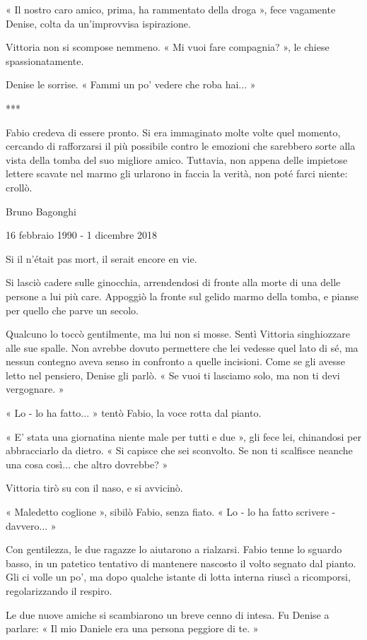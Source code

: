 « Il nostro caro amico, prima, ha rammentato della droga », fece vagamente Denise, colta da un'improvvisa ispirazione.

Vittoria non si scompose nemmeno. « Mi vuoi fare compagnia? », le chiese spassionatamente.

Denise le sorrise. « Fammi un po' vedere che roba hai... »

***

Fabio credeva di essere pronto. Si era immaginato molte volte quel momento, cercando di rafforzarsi il più possibile contro le emozioni che sarebbero sorte alla vista della tomba del suo migliore amico. Tuttavia, non appena delle impietose lettere scavate nel marmo gli urlarono in faccia la verità, non poté farci niente: crollò.

Bruno Bagonghi

16 febbraio 1990 - 1 dicembre 2018

Si il n'était pas mort, il serait encore en vie.

Si lasciò cadere sulle ginocchia, arrendendosi di fronte alla morte di una delle persone a lui più care. Appoggiò la fronte sul gelido marmo della tomba, e pianse per quello che parve un secolo.

Qualcuno lo toccò gentilmente, ma lui non si mosse. Sentì Vittoria singhiozzare alle sue spalle. Non avrebbe dovuto permettere che lei vedesse quel lato di sé, ma nessun contegno aveva senso in confronto a quelle incisioni. Come se gli avesse letto nel pensiero, Denise gli parlò. « Se vuoi ti lasciamo solo, ma non ti devi vergognare. »

« Lo - lo ha fatto... » tentò Fabio, la voce rotta dal pianto.

« E' stata una giornatina niente male per tutti e due », gli fece lei, chinandosi per abbracciarlo da dietro. « Si capisce che sei sconvolto. Se non ti scalfisce neanche una cosa così... che altro dovrebbe? »

Vittoria tirò su con il naso, e si avvicinò.

« Maledetto coglione », sibilò Fabio, senza fiato. « Lo - lo ha fatto scrivere - davvero... »

Con gentilezza, le due ragazze lo aiutarono a rialzarsi. Fabio tenne lo sguardo basso, in un patetico tentativo di mantenere nascosto il volto segnato dal pianto. Gli ci volle un po', ma dopo qualche istante di lotta interna riuscì a ricomporsi, regolarizzando il respiro.

Le due nuove amiche si scambiarono un breve cenno di intesa. Fu Denise a parlare: « Il mio Daniele era una persona peggiore di te. »

